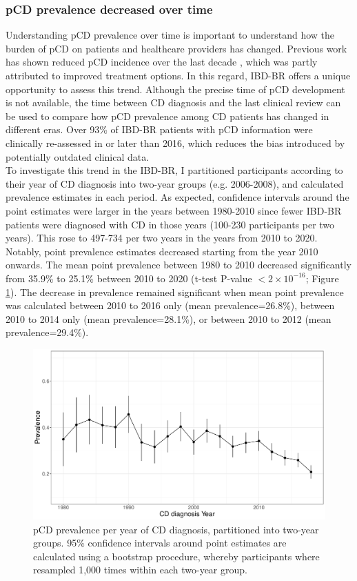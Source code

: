     \subsubsection{pCD prevalence decreased over time}
    Understanding pCD prevalence over time is important to understand how the burden of pCD on patients and healthcare providers has changed. Previous work has shown reduced pCD incidence over the last decade \cite{Park2019-kj}, which was partly attributed to improved treatment options. In this regard, IBD-BR offers a unique opportunity to assess this trend. Although the precise time of pCD development is not available, the time between CD diagnosis and the last clinical review can be used to compare how pCD prevalence among CD patients has changed in different eras. Over 93\% of IBD-BR patients with pCD information were clinically re-assessed in or later than 2016, which reduces the bias introduced by potentially outdated clinical data. \\
    
    To investigate this trend in the IBD-BR, I partitioned participants according to their year of CD diagnosis into two-year groups (e.g. 2006-2008), and calculated prevalence estimates in each period. As expected, confidence intervals around the point estimates were larger in the years between 1980-2010 since fewer IBD-BR patients were diagnosed with CD in those years (100-230 participants per two years). This rose to 497-734 per two years in the years from 2010 to 2020.  Notably, point prevalence estimates decreased starting from the year 2010 onwards. The mean point prevalence between 1980 to 2010 decreased significantly from 35.9\% to 25.1\% between 2010 to 2020 (t-test P-value $<2\times10^{-16}$; Figure \ref{fig:pcd_prev}). The decrease in prevalence remained significant when mean point prevalence was calculated between 2010 to 2016 only (mean prevalence=26.8\%), between 2010 to 2014 only (mean prevalence=28.1\%), or between 2010 to 2012 (mean prevalence=29.4\%).\\
    \begin{figure}[htb] 
      \centering    
      \includegraphics[width=1.0\textwidth]{fig2}
      \caption[pCD prevalence temporal trend from 1980 till 2020]{pCD prevalence per year of CD diagnosis, partitioned into two-year groups. 95\% confidence intervals around point estimates are calculated using a bootstrap procedure, whereby participants where resampled 1,000 times within each two-year group.}
      \label{fig:pcd_prev}
      \end{figure}
 
